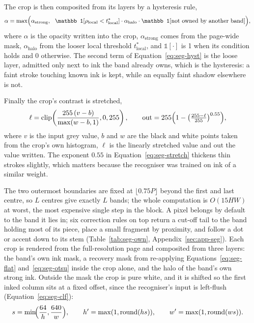 The crop is then composited from its layers by a hysteresis rule,
\begin{equation}
\alpha=\max\Bigl(\alpha_{\mathrm{strong}},\ \ \mathbb 1[\rho_{\mathrm{local}}<t^*_{\mathrm{local}}]\cdot\alpha_{\mathrm{halo}}\cdot\mathbb 1[\text{not owned by another band}]\Bigr),
\label{eq:seg-hyst}
\end{equation}
where $\alpha$ is the opacity written into the crop, $\alpha_{\mathrm{strong}}$ comes from the page-wide mask, $\alpha_{\mathrm{halo}}$ from the looser local threshold $t^*_{\mathrm{local}}$, and $\mathbb 1[\cdot]$ is 1 when its condition holds and 0 otherwise. The second term of Equation~\ref{eq:seg-hyst} is the loose layer, admitted only next to ink the band already owns, which is the hysteresis: a faint stroke touching known ink is kept, while an equally faint shadow elsewhere is not.

Finally the crop's contrast is stretched,
\begin{equation}
\ell=\mathrm{clip}\!\left(\frac{255\,(v-b)}{\max(w-b,1)},0,255\right),\qquad
\mathrm{out}=255\Bigl(1-\bigl(\tfrac{255-\ell}{255}\bigr)^{0.55}\Bigr),
\label{eq:seg-stretch}
\end{equation}
where $v$ is the input grey value, $b$ and $w$ are the black and white points taken from the crop's own histogram, $\ell$ is the linearly stretched value and $\mathrm{out}$ the value written. The exponent $0.55$ in Equation~\ref{eq:seg-stretch} thickens thin strokes slightly, which matters because the recogniser was trained on ink of a similar weight.

The two outermost boundaries are fixed at $\lfloor0.75P\rfloor$ beyond the first and last centre, so $L$ centres give exactly $L$ bands; the whole computation is $O(15HW)$ at worst, the most expensive single step in the block. A pixel belongs by default to the band it lies in; six correction rules on top return a cut-off tail to the band holding most of its piece, place a small fragment by proximity, and follow a dot or accent down to its stem (Table~\ref{tab:seg-own}, Appendix~\ref{sec:app-seg}). Each crop is rendered from the full-resolution page and composited from three layers: the band's own ink mask, a recovery mask from re-applying Equations~\ref{eq:seg-flat} and~\ref{eq:seg-otsu} inside the crop alone, and the halo of the band's own strong ink. Outside the mask the crop is pure white, and it is shifted so the first inked column sits at a fixed offset, since the recogniser's input is left-flush (Equation~\ref{eq:seg-clf}):
\begin{equation}
s=\min\!\Bigl(\frac{64}{h},\frac{640}{w}\Bigr),\qquad h'=\max(1,\mathrm{round}(hs)),\qquad w'=\max(1,\mathrm{round}(ws)).\label{eq:seg-clf}
\end{equation}

